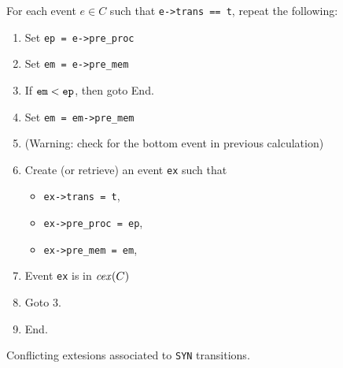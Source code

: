 \documentclass{llncs}
\begin{document}
\begin{algorithm}
\noindent
For each event $e \in C$ such that \verb!e->trans == t!, repeat the following:
\begin{enumerate}
\item Set \verb!ep = e->pre_proc!
\item Set \verb!em = e->pre_mem!
\item If $\verb!em! < \verb!ep!$, then goto End.
\item Set \verb!em = em->pre_mem!
\item (Warning: check for the bottom event in previous calculation)
\item
  Create (or retrieve) an event \verb!ex! such that
  \begin{itemize}
  \item \verb!ex->trans = t!,
  \item \verb!ex->pre_proc = ep!,
  \item \verb!ex->pre_mem = em!,
  \end{itemize}
\item Event \verb!ex! is in $\mathop{\mathit{cex}} (C)$
\item Goto 3.
\item End.
\end{enumerate}

\caption{Conflicting extesions associated to \texttt{SYN} transitions.}
\label{a:cex_syn}
\end{algorithm}
\end{document}
